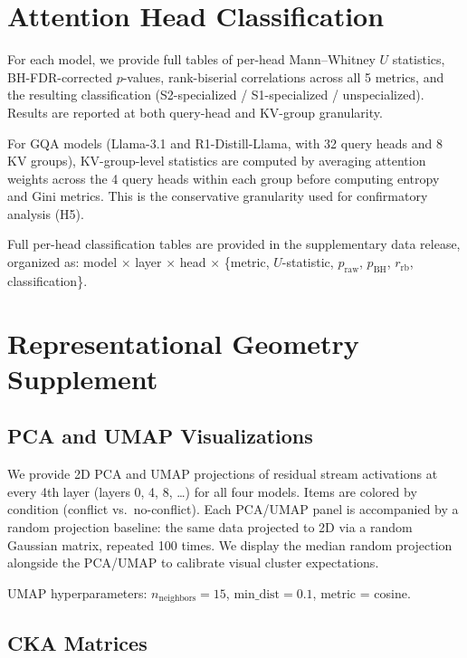 \section{Attention Head Classification}
\label{app:attention}

For each model, we provide full tables of per-head Mann--Whitney $U$
statistics, BH-FDR-corrected $p$-values, rank-biserial correlations across
all 5 metrics, and the resulting classification (S2-specialized /
S1-specialized / unspecialized).  Results are reported at both query-head
and KV-group granularity.

For GQA models (Llama-3.1 and R1-Distill-Llama, with 32 query heads and 8
KV groups), KV-group-level statistics are computed by averaging attention
weights across the 4 query heads within each group before computing entropy
and Gini metrics.  This is the conservative granularity used for
confirmatory analysis (H5).

Full per-head classification tables are provided in the supplementary data
release, organized as: model $\times$ layer $\times$ head $\times$
\{metric, $U$-statistic, $p_{\text{raw}}$, $p_{\text{BH}}$,
$r_{\text{rb}}$, classification\}.

\section{Representational Geometry Supplement}
\label{app:geometry}

\subsection{PCA and UMAP Visualizations}

We provide 2D PCA and UMAP projections of residual stream activations at
every 4th layer (layers 0, 4, 8, \ldots) for all four models.  Items are
colored by condition (conflict vs.\ no-conflict).  Each PCA/UMAP panel is
accompanied by a random projection baseline: the same data projected to 2D
via a random Gaussian matrix, repeated 100 times.  We display the median
random projection alongside the PCA/UMAP to calibrate visual cluster
expectations.

UMAP hyperparameters: $n_{\text{neighbors}} = 15$, $\text{min\_dist} =
0.1$, metric = cosine.

\subsection{CKA Matrices}

